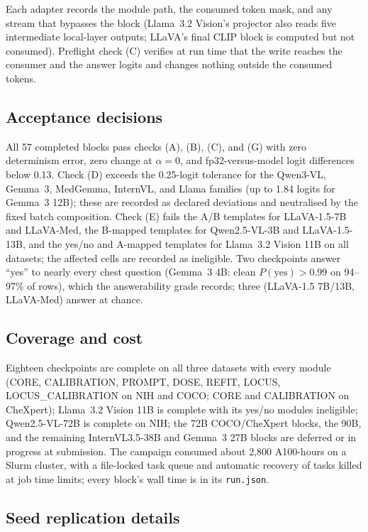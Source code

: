 Each adapter records the module path, the consumed token mask, and any stream that bypasses the block (Llama~3.2 Vision's projector also reads five intermediate local-layer outputs; LLaVA's final CLIP block is computed but not consumed). Preflight check (C) verifies at run time that the write reaches the consumer and the answer logits and changes nothing outside the consumed tokens.

\subsection{Acceptance decisions}
\label{app:cf-gates}

All 57 completed blocks pass checks (A), (B), (C), and (G) with zero determinism error, zero change at $\alpha=0$, and fp32-versus-model logit differences below 0.13. Check (D) exceeds the 0.25-logit tolerance for the Qwen3-VL, Gemma~3, MedGemma, InternVL, and Llama families (up to 1.84 logits for Gemma~3 12B); these are recorded as declared deviations and neutralised by the fixed batch composition. Check (E) fails the A/B templates for LLaVA-1.5-7B and LLaVA-Med, the B-mapped templates for Qwen2.5-VL-3B and LLaVA-1.5-13B, and the yes/no and A-mapped templates for Llama~3.2 Vision 11B on all datasets; the affected cells are recorded as ineligible. Two checkpoints answer ``yes'' to nearly every chest question (Gemma~3 4B: clean $P(\mathrm{yes})>0.99$ on 94--97\% of rows), which the answerability grade records; three (LLaVA-1.5 7B/13B, LLaVA-Med) answer at chance.

\subsection{Coverage and cost}
\label{app:cf-coverage}

Eighteen checkpoints are complete on all three datasets with every module (CORE, CALIBRATION, PROMPT, DOSE, REFIT, LOCUS, LOCUS\_CALIBRATION on NIH and COCO; CORE and CALIBRATION on CheXpert); Llama~3.2 Vision 11B is complete with its yes/no modules ineligible; Qwen2.5-VL-72B is complete on NIH; the 72B COCO/CheXpert blocks, the 90B, and the remaining InternVL3.5-38B and Gemma~3 27B blocks are deferred or in progress at submission. The campaign consumed about 2,800 A100-hours on a Slurm cluster, with a file-locked task queue and automatic recovery of tasks killed at job time limits; every block's wall time is in its \texttt{run.json}.

\subsection{Seed replication details}
\label{app:cf-seed}

